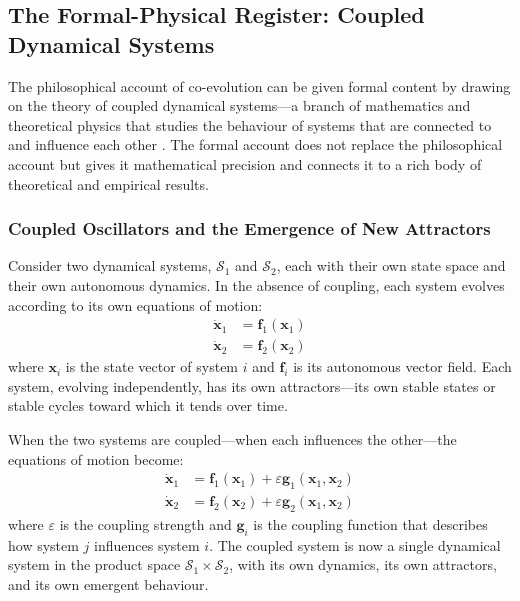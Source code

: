 \subsection{The Formal-Physical Register: Coupled Dynamical Systems}
\label{p14:subsec:formalcoevo}

\noindent
The philosophical account of co-evolution can be given formal content by drawing on the theory of coupled dynamical systems---a branch of mathematics and theoretical physics that studies the behaviour of systems that are connected to and influence each other \parencite{strogatz2001,kuramoto1984}. The formal account does not replace the philosophical account but gives it mathematical precision and connects it to a rich body of theoretical and empirical results.

\subsubsection{Coupled Oscillators and the Emergence of New Attractors}
\label{p14:subsubsec:coupled}

\noindent
Consider two dynamical systems, $\mathcal{S}_1$ and $\mathcal{S}_2$, each with their own state space and their own autonomous dynamics. In the absence of coupling, each system evolves according to its own equations of motion:
\begin{align}
\dot{\mathbf{x}}_1 &= \mathbf{f}_1(\mathbf{x}_1) \\
\dot{\mathbf{x}}_2 &= \mathbf{f}_2(\mathbf{x}_2)
\end{align}
where $\mathbf{x}_i$ is the state vector of system $i$ and $\mathbf{f}_i$ is its autonomous vector field. Each system, evolving independently, has its own attractors---its own stable states or stable cycles toward which it tends over time.

When the two systems are coupled---when each influences the other---the equations of motion become:
\begin{align}
\dot{\mathbf{x}}_1 &= \mathbf{f}_1(\mathbf{x}_1) + \varepsilon \mathbf{g}_1(\mathbf{x}_1, \mathbf{x}_2) \\
\dot{\mathbf{x}}_2 &= \mathbf{f}_2(\mathbf{x}_2) + \varepsilon \mathbf{g}_2(\mathbf{x}_1, \mathbf{x}_2)
\end{align}
where $\varepsilon$ is the coupling strength and $\mathbf{g}_i$ is the coupling function that describes how system $j$ influences system $i$. The coupled system is now a single dynamical system in the product space $\mathcal{S}_1 \times \mathcal{S}_2$, with its own dynamics, its own attractors, and its own emergent behaviour.

